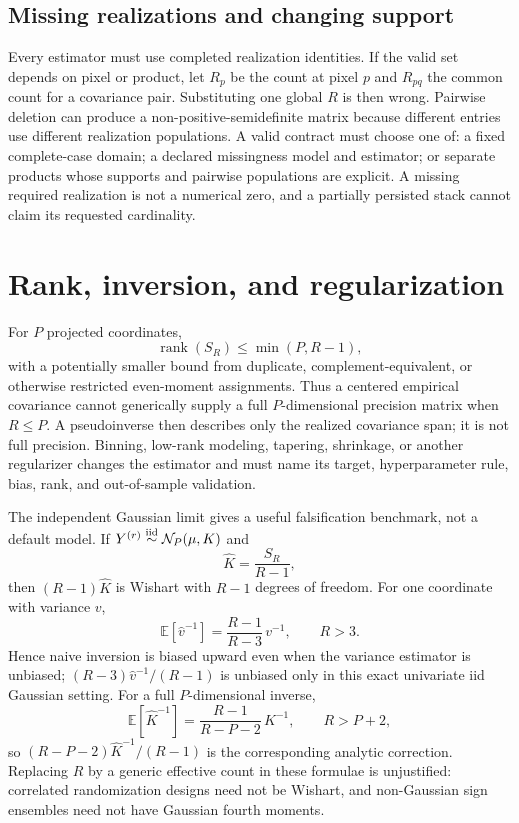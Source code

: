 \documentclass[11pt]{article}
\newcommand{\E}{\mathbb{E}}
\newcommand{\rank}{\operatorname{rank}}
\begin{document}
\subsection{Missing realizations and changing support}

Every estimator must use completed realization identities.  If the valid set
depends on pixel or product, let $R_p$ be the count at pixel $p$ and $R_{pq}$
the common count for a covariance pair.  Substituting one global $R$ is then
wrong.  Pairwise deletion can produce a non-positive-semidefinite matrix
because different entries use different realization populations.  A valid
contract must choose one of: a fixed complete-case domain; a declared
missingness model and estimator; or separate products whose supports and
pairwise populations are explicit.  A missing required realization is not a
numerical zero, and a partially persisted stack cannot claim its requested
cardinality.

\section{Rank, inversion, and regularization}

For $P$ projected coordinates,
\begin{equation}
  \rank(S_R)\le\min(P,R-1),
  \label{eq:rank-bound}
\end{equation}
with a potentially smaller bound from duplicate, complement-equivalent, or
otherwise restricted even-moment assignments.  Thus a centered empirical
covariance cannot generically supply a full $P$-dimensional precision matrix
when $R\le P$.  A pseudoinverse then describes only the realized covariance
span; it is not full precision.  Binning, low-rank modeling, tapering,
shrinkage, or another regularizer changes the estimator and must name its
target, hyperparameter rule, bias, rank, and out-of-sample validation.

The independent Gaussian limit gives a useful falsification benchmark, not a
default model.  If $Y^{(r)}\stackrel{\rm iid}{\sim}\mathcal N_P(\mu,K)$ and
\begin{equation}
  \widehat K=\frac{S_R}{R-1},
  \label{eq:gaussian-sample-covariance}
\end{equation}
then $(R-1)\widehat K$ is Wishart with $R-1$ degrees of freedom.  For one
coordinate with variance $v$,
\begin{equation}
  \E[\widehat v^{-1}]
  =\frac{R-1}{R-3}\,v^{-1},
  \qquad R>3.
  \label{eq:inverse-variance-bias}
\end{equation}
Hence naive inversion is biased upward even when the variance estimator is
unbiased; $(R-3)\widehat v^{-1}/(R-1)$ is unbiased only in this exact
univariate iid Gaussian setting.  For a full $P$-dimensional inverse,
\begin{equation}
  \E[\widehat K^{-1}]
  =\frac{R-1}{R-P-2}\,K^{-1},
  \qquad R>P+2,
  \label{eq:inverse-covariance-bias}
\end{equation}
so $(R-P-2)\widehat K^{-1}/(R-1)$ is the corresponding analytic correction.
Replacing $R$ by a generic effective count in these formulae is unjustified:
correlated randomization designs need not be Wishart, and non-Gaussian sign
ensembles need not have Gaussian fourth moments.
\end{document}
